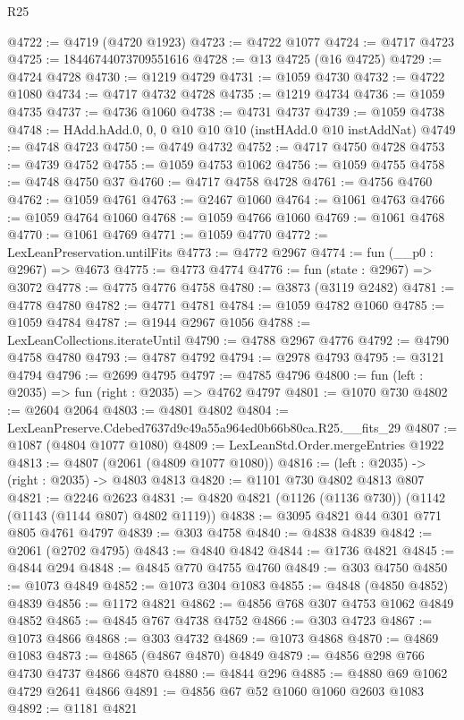 \begin{lexlean}{R25}
\begin{coremodule}
@4722 := @4719 (@4720 @1923)
@4723 := @4722 @1077
@4724 := @4717 @4723
@4725 := 18446744073709551616
@4728 := @13 @4725 (@16 @4725)
@4729 := @4724 @4728
@4730 := @1219 @4729
@4731 := @1059 @4730
@4732 := @4722 @1080
@4734 := @4717 @4732 @4728
@4735 := @1219 @4734
@4736 := @1059 @4735
@4737 := @4736 @1060
@4738 := @4731 @4737
@4739 := @1059 @4738
@4748 := HAdd.hAdd.{0, 0, 0} @10 @10 @10 (instHAdd.{0} @10 instAddNat)
@4749 := @4748 @4723
@4750 := @4749 @4732
@4752 := @4717 @4750 @4728
@4753 := @4739 @4752
@4755 := @1059 @4753 @1062
@4756 := @1059 @4755
@4758 := @4748 @4750 @37
@4760 := @4717 @4758 @4728
@4761 := @4756 @4760
@4762 := @1059 @4761
@4763 := @2467 @1060
@4764 := @1061 @4763
@4766 := @1059 @4764 @1060
@4768 := @1059 @4766 @1060
@4769 := @1061 @4768
@4770 := @1061 @4769
@4771 := @1059 @4770
@4772 := LexLeanPreservation.untilFits
@4773 := @4772 @2967
@4774 := fun (__p0 : @2967) => @4673
@4775 := @4773 @4774
@4776 := fun (state : @2967) => @3072
@4778 := @4775 @4776 @4758
@4780 := @3873 (@3119 @2482)
@4781 := @4778 @4780
@4782 := @4771 @4781
@4784 := @1059 @4782 @1060
@4785 := @1059 @4784
@4787 := @1944 @2967 @1056
@4788 := LexLeanCollections.iterateUntil
@4790 := @4788 @2967 @4776
@4792 := @4790 @4758 @4780
@4793 := @4787 @4792
@4794 := @2978 @4793
@4795 := @3121 @4794
@4796 := @2699 @4795
@4797 := @4785 @4796
@4800 := fun (left : @2035) => fun (right : @2035) => @4762 @4797
@4801 := @1070 @730
@4802 := @2604 @2064
@4803 := @4801 @4802
@4804 := LexLeanPreserve.Cdebed7637d9c49a55a964ed0b66b80ca.R25.__fits_29
@4807 := @1087 (@4804 @1077 @1080)
@4809 := LexLeanStd.Order.mergeEntries @1922
@4813 := @4807 (@2061 (@4809 @1077 @1080))
@4816 := (left : @2035) -> (right : @2035) -> @4803 @4813
@4820 := @1101 @730 @4802 @4813 @807
@4821 := @2246 @2623
@4831 := @4820 @4821 (@1126 (@1136 @730)) (@1142 (@1143 (@1144 @807) @4802 @1119))
@4838 := @3095 @4821 @44 @301 @771 @805 @4761 @4797
@4839 := @303 @4758
@4840 := @4838 @4839
@4842 := @2061 (@2702 @4795)
@4843 := @4840 @4842
@4844 := @1736 @4821
@4845 := @4844 @294
@4848 := @4845 @770 @4755 @4760
@4849 := @303 @4750
@4850 := @1073 @4849
@4852 := @1073 @304 @1083
@4855 := @4848 (@4850 @4852) @4839
@4856 := @1172 @4821
@4862 := @4856 @768 @307 @4753 @1062 @4849 @4852
@4865 := @4845 @767 @4738 @4752
@4866 := @303 @4723
@4867 := @1073 @4866
@4868 := @303 @4732
@4869 := @1073 @4868
@4870 := @4869 @1083
@4873 := @4865 (@4867 @4870) @4849
@4879 := @4856 @298 @766 @4730 @4737 @4866 @4870
@4880 := @4844 @296
@4885 := @4880 @69 @1062 @4729 @2641 @4866
@4891 := @4856 @67 @52 @1060 @1060 @2603 @1083
@4892 := @1181 @4821

\end{coremodule}
\end{lexlean}
